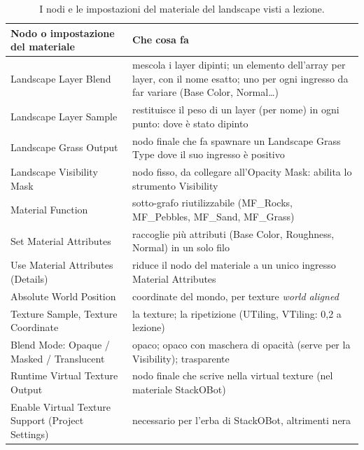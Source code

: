 \begin{table}[htbp]
\centering
\small
\begin{tabular}{@{}p{4.4cm}p{9.6cm}@{}}
\toprule
\textbf{Nodo o impostazione del materiale} & \textbf{Che cosa fa} \\
\midrule
Landscape Layer Blend & mescola i layer dipinti; un elemento dell'array per layer, con il
nome esatto; uno per ogni ingresso da far variare (Base Color, Normal\dots) \\
Landscape Layer Sample & restituisce il peso di un layer (per nome) in ogni punto: dove è
stato dipinto \\
Landscape Grass Output & nodo finale che fa spawnare un Landscape Grass Type dove il suo
ingresso è positivo \\
Landscape Visibility Mask & nodo fisso, da collegare all'Opacity Mask: abilita lo strumento
Visibility \\
Material Function & sotto-grafo riutilizzabile (MF\_Rocks, MF\_Pebbles, MF\_Sand, MF\_Grass) \\
Set Material Attributes & raccoglie più attributi (Base Color, Roughness, Normal) in un solo
filo \\
Use Material Attributes (Details) & riduce il nodo del materiale a un unico ingresso
Material Attributes \\
Absolute World Position & coordinate del mondo, per texture \emph{world aligned} \\
Texture Sample, Texture Coordinate & la texture; la ripetizione (UTiling, VTiling: 0,2 a
lezione) \\
Blend Mode: Opaque / Masked / Translucent & opaco; opaco con maschera di opacità (serve per
la Visibility); trasparente \\
Runtime Virtual Texture Output & nodo finale che scrive nella virtual texture (nel materiale
StackOBot) \\
Enable Virtual Texture Support (Project Settings) & necessario per l'erba di StackOBot,
altrimenti nera \\
\bottomrule
\end{tabular}
\caption{I nodi e le impostazioni del materiale del landscape visti a lezione.}
\label{ue14:tab:nodimateriale}
\end{table}

